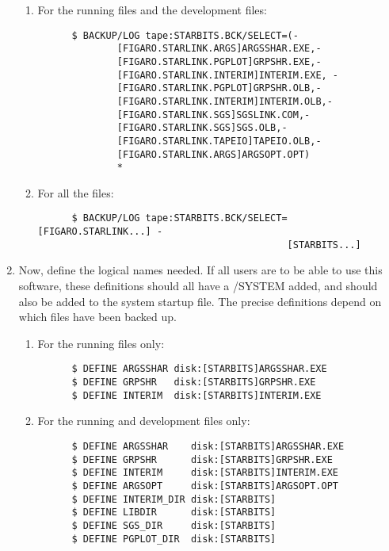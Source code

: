 \begin{enumerate}
\begin{enumerate}
\item For the running files and the development files:

\begin{verbatim}
      $ BACKUP/LOG tape:STARBITS.BCK/SELECT=(-
              [FIGARO.STARLINK.ARGS]ARGSSHAR.EXE,-
              [FIGARO.STARLINK.PGPLOT]GRPSHR.EXE,-
              [FIGARO.STARLINK.INTERIM]INTERIM.EXE, -
              [FIGARO.STARLINK.PGPLOT]GRPSHR.OLB,-
              [FIGARO.STARLINK.INTERIM]INTERIM.OLB,-
              [FIGARO.STARLINK.SGS]SGSLINK.COM,-
              [FIGARO.STARLINK.SGS]SGS.OLB,-
              [FIGARO.STARLINK.TAPEIO]TAPEIO.OLB,-
              [FIGARO.STARLINK.ARGS]ARGSOPT.OPT)
              *
\end{verbatim}

\item For all the files:

\begin{verbatim}
      $ BACKUP/LOG tape:STARBITS.BCK/SELECT=[FIGARO.STARLINK...] -
                                            [STARBITS...]
\end{verbatim}

\end{enumerate}

\item Now, define the logical names needed. If all users are to be able to use
this software, these definitions should all have a /SYSTEM added, and should
also be added to the system startup file. The precise definitions depend on
which files have been backed up.

\begin{enumerate}

\item For the running files only:

\begin{verbatim}
      $ DEFINE ARGSSHAR disk:[STARBITS]ARGSSHAR.EXE
      $ DEFINE GRPSHR   disk:[STARBITS]GRPSHR.EXE
      $ DEFINE INTERIM  disk:[STARBITS]INTERIM.EXE
\end{verbatim}

\item For the running and development files only:

\begin{verbatim}
      $ DEFINE ARGSSHAR    disk:[STARBITS]ARGSSHAR.EXE
      $ DEFINE GRPSHR      disk:[STARBITS]GRPSHR.EXE
      $ DEFINE INTERIM     disk:[STARBITS]INTERIM.EXE
      $ DEFINE ARGSOPT     disk:[STARBITS]ARGSOPT.OPT
      $ DEFINE INTERIM_DIR disk:[STARBITS]
      $ DEFINE LIBDIR      disk:[STARBITS]
      $ DEFINE SGS_DIR     disk:[STARBITS]
      $ DEFINE PGPLOT_DIR  disk:[STARBITS]
\end{verbatim}


\end{enumerate}
\end{enumerate}
